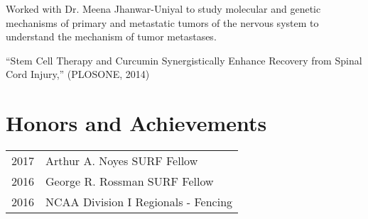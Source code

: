 \documentclass[letterpaper]{deedy-resume} %
\begin{document}
\begin{minipage}[t]{0.58\textwidth}
\sectionspace


\begin{tightitemize}
\item Worked with Dr. Meena Jhanwar-Uniyal to study molecular and genetic mechanisms of primary and metastatic tumors of the nervous system to understand the mechanism of tumor metastases.
\item ``Stem Cell Therapy and Curcumin Synergistically Enhance Recovery from Spinal Cord Injury,'' (PLOSONE, 2014)
\end{tightitemize}

\sectionspace %



\section{Honors and Achievements} 

\begin{tabular}{rl}
	2017	 & Arthur A. Noyes SURF Fellow \\
	2016	 & George R. Rossman SURF Fellow  \\
	2016	 & NCAA Division I Regionals - Fencing\\
\end{tabular}





\end{minipage}
\end{document}

